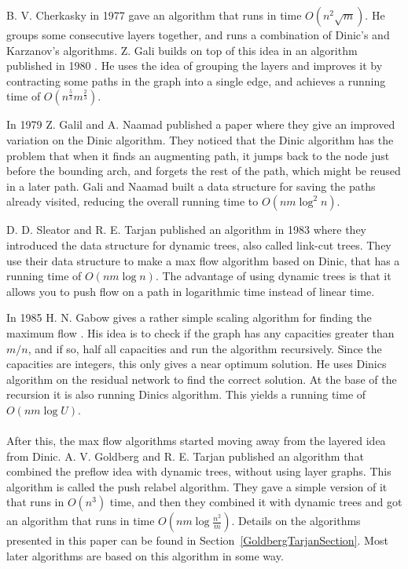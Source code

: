 B. V. Cherkasky in 1977 gave an algorithm that runs in time $O(n^2\sqrt{m})$. 
He groups some consecutive layers together, and runs a combination of Dinic's and Karzanov's algorithms.
Z. Gali builds on top of this idea in an algorithm published in 1980 \cite{Galil1980}. 
He uses the idea of grouping the layers and improves it by contracting some paths in the graph into a single edge, and achieves a running time of $O(n^\frac{5}{3}m^\frac{2}{3})$.

In 1979 Z. Galil and A. Naamad published a paper \cite{Galil1979} where they give an improved variation on the Dinic algorithm. 
They noticed that the Dinic algorithm has the problem that when it finds an augmenting path, it jumps back to the node just before the bounding arch, 
and forgets the rest of the path, which might be reused in a later path.
Gali and Naamad built a data structure for saving the paths already visited, reducing the overall running time to $O(nm\log^2n)$.

D. D. Sleator and R. E. Tarjan published an algorithm in 1983 \cite{sleator1983} where they introduced the data structure for dynamic trees, also called link-cut trees.
They use their data structure to make a max flow algorithm based on Dinic, that has a running time of $O(nm\log n)$. 
The advantage of using dynamic trees is that it allows you to push flow on a path in logarithmic time instead of linear time.

In 1985 H. N. Gabow gives a rather simple scaling algorithm for finding the maximum flow \cite{Gabow1985}. His idea is to check if the graph has any capacities greater than $m/n$, 
and if so, half all capacities and run the algorithm recursively. Since the capacities are integers, this only gives a near optimum solution.
He uses Dinics algorithm on the residual network to find the correct solution. At the base of the recursion it is also running Dinics algorithm. 
This yields a running time of $O(nm\log{U})$.
\\\\	
After this, the max flow algorithms started moving away from the layered idea from Dinic. 
A. V. Goldberg and R. E. Tarjan published an algorithm \cite{Goldberg1988} that combined the preflow idea with dynamic trees, without using layer graphs.
This algorithm is called the push relabel algorithm. They gave a simple version of it that runs in $O(n^3)$ time, 
and then they combined it with dynamic trees and got an algorithm that runs in time $O(nm\log{\frac{n^2}{m}})$.
Details on the algorithms presented in this paper can be found in Section~\ref{GoldbergTarjanSection}.
Most later algorithms are based on this algorithm in some way.

